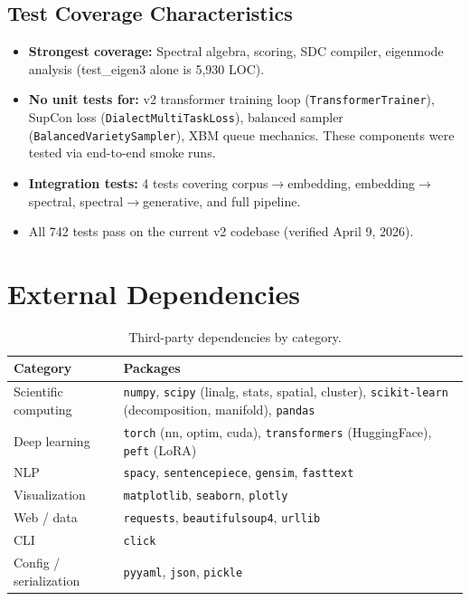 \documentclass[11pt,a4paper]{article}
\begin{document}
\subsection{Test Coverage Characteristics}

\begin{itemize}[nosep]
  \item \textbf{Strongest coverage:} Spectral algebra, scoring, SDC compiler,
        eigenmode analysis (test\_eigen3 alone is 5{,}930 LOC).
  \item \textbf{No unit tests for:} v2 transformer training loop
        (\texttt{TransformerTrainer}), SupCon loss (\texttt{DialectMultiTaskLoss}),
        balanced sampler (\texttt{BalancedVarietySampler}), XBM queue mechanics.
        These components were tested via end-to-end smoke runs.
  \item \textbf{Integration tests:} 4 tests covering corpus$\to$embedding,
        embedding$\to$spectral, spectral$\to$generative, and full pipeline.
  \item All 742 tests pass on the current v2 codebase (verified April 9, 2026).
\end{itemize}


\section{External Dependencies}

\begin{table}[H]
\centering
\caption{Third-party dependencies by category.}
\small
\begin{tabular}{@{}lp{10cm}@{}}
\toprule
\textbf{Category} & \textbf{Packages} \\
\midrule
Scientific computing & \texttt{numpy}, \texttt{scipy} (linalg, stats, spatial, cluster), \texttt{scikit-learn} (decomposition, manifold), \texttt{pandas} \\
Deep learning & \texttt{torch} (nn, optim, cuda), \texttt{transformers} (HuggingFace), \texttt{peft} (LoRA) \\
NLP & \texttt{spacy}, \texttt{sentencepiece}, \texttt{gensim}, \texttt{fasttext} \\
Visualization & \texttt{matplotlib}, \texttt{seaborn}, \texttt{plotly} \\
Web / data & \texttt{requests}, \texttt{beautifulsoup4}, \texttt{urllib} \\
CLI & \texttt{click} \\
Config / serialization & \texttt{pyyaml}, \texttt{json}, \texttt{pickle} \\
\bottomrule
\end{tabular}
\end{table}
\end{document}
